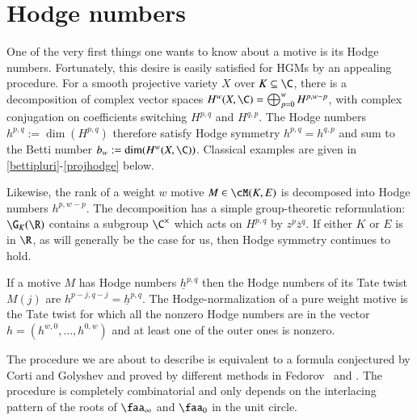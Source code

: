 \documentclass{notices}
\numberwithin{equation}{section}
\numberwithin{table}{section}
\numberwithin{figure}{section}
\begin{document}
{ 


 











\section{Hodge numbers}
\label{sect:hodge-numbers}
   One of the very first things one wants to know about a
motive is its Hodge numbers.  Fortunately, this desire is easily
satisfied for HGMs by an appealing procedure.     
   For a smooth projective variety $X$ over 
$K \subseteq \C$, 
there is a decomposition of complex vector spaces
$
H^w(X,\C) = \bigoplus_{p=0}^w H^{p,w-p}
$, with complex conjugation
on coefficients switching $H^{p,q}$ and $H^{q,p}$.  
 The Hodge numbers $h^{p,q} := \dim(H^{p,q})$ therefore satisfy 
Hodge symmetry $h^{p,q}=h^{q,p}$ and sum to the 
Betti number $b_w := \dim(H^w(X,\C))$.   Classical examples are given
in \eqref{bettipluri}-\eqref{projhodge} below.  

Likewise, the rank of a weight $w$ motive 
$M \in \cM(K,E)$ is decomposed into Hodge 
numbers $h^{p,w-p}$.  The decomposition has a simple 
group-theoretic reformulation: $\G_K(\R)$
contains a subgroup $\C^\times$ 
which acts on $H^{p,q}$ by $z^p \overline{z}^q$.  
If either $K$ or $E$ is in $\R$, as will generally
be the case for us, then 
Hodge symmetry continues to hold.  

If a motive $M$ has Hodge numbers
$\underline{h}^{p,q}$ then the Hodge numbers 
 of its Tate twist $M(j)$ are 
 ${h}^{p-j,q-j} = \underline{h}^{p,q}$.
 The Hodge-normalization of 
 a pure weight motive is the Tate twist
 for which all the nonzero Hodge 
 numbers are in the vector 
 $h=(h^{w,0},\dots,h^{0,w})$ and at least one of
 the outer ones is nonzero.  
  
The procedure we are about to describe is equivalent to a formula
conjectured by Corti and Golyshev \cite{CG} and proved
by different methods in Fedorov~\cite{Fed} and \cite{RV-Mixed}.  The 
procedure is completely combinatorial and only depends on the
interlacing pattern of the roots of $\faa_\infty$ and $\faa_0$ in the
unit circle.

}
\end{document}
